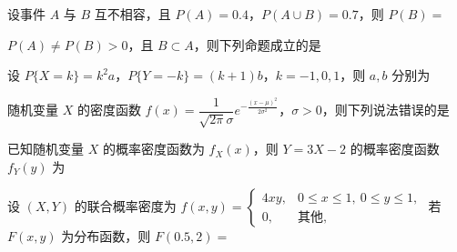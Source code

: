 \documentclass{../template/cqutest}
\begin{document}

\begin{examquestions}
  \item 设事件 $A$ 与 $B$ 互不相容，且 $P(A)=0.4$，$P(A\cup B)=0.7$，则 $P(B)=$\choiceanswer{}

  \item $P(A)\ne P(B)>0$，且 $B\subset A$，则下列命题成立的是\choiceanswer{}

  \item 设 $P\{X=k\}=k^2a$，$P\{Y=-k\}=(k+1)b$，$k=-1,0,1$，则 $a,b$ 分别为\choiceanswer{}

  \item 随机变量 $X$ 的密度函数 $f(x)=\dfrac{1}{\sqrt{2\pi}\sigma}e^{-\frac{(x-\mu)^2}{2\sigma^2}}$，$\sigma>0$，则下列说法错误的是\choiceanswer{}

  \item 已知随机变量 $X$ 的概率密度函数为 $f_X(x)$，则 $Y=3X-2$ 的概率密度函数 $f_Y(y)$ 为\choiceanswer{}

  \item 设 $(X,Y)$ 的联合概率密度为 $f(x,y)=\begin{cases}4xy,&0\le x\le1,\ 0\le y\le1,\\0,&\text{其他},\end{cases}$ 若 $F(x,y)$ 为分布函数，则 $F(0.5,2)=$\choiceanswer{}
\end{examquestions}
\end{document}
